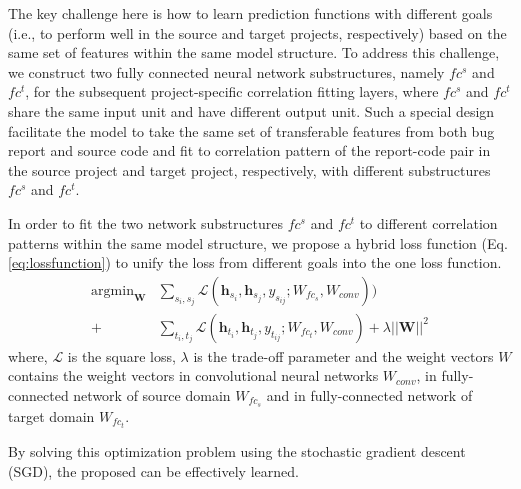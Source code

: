 The key challenge here is how to learn prediction functions with different goals (i.e., to perform well in the source and target projects, respectively) based on the same set of features within the same model structure. To address this challenge, we construct two fully connected neural network substructures, namely $fc^s$ and $fc^t$, for the subsequent project-specific correlation fitting layers, where $fc^s$ and $fc^t$ share the same input unit and have different output unit. Such a special design facilitate the model to take the same set of transferable features from both bug report and source code and fit to correlation pattern of the report-code pair in the source project and target project, respectively, with different substructures $fc^s$ and $fc^t$.

In order to fit the two network substructures $fc^s$ and $fc^t$ to different correlation patterns within the same model structure, we propose a hybrid loss function (Eq. \ref{eq:lossfunction}) to unify the loss from different goals into the one loss function.
\begin{equation}
\begin{aligned}
\label{eq:lossfunction}
\mathop{\arg\min}_{\mathbf{W}}&\sum_{s_i,s_j}\mathcal{L}(\mathbf{h}_{s_i},\mathbf{h}_{s_j}
,y_{s_{ij}}; W_{fc_s}, W_{conv} ))\\
+&\sum_{t_i,t_j}\mathcal{L}(\mathbf{h}_{t_i},\mathbf{h}_{t_j},y_{t_{ij}}; W_{fc_t}, W_{conv})+\lambda||\mathbf{W}||^2
\end{aligned}
\end{equation}
where, $\mathcal{L}$ is the square loss, $\lambda$ is the trade-off parameter and the weight vectors $W$ contains the weight vectors in convolutional neural networks $W_{conv}$, in fully-connected network of source domain $W_{fc_s}$ and in fully-connected network of target domain $W_{fc_t}$.

By solving this optimization problem using the stochastic gradient descent (SGD), the proposed \TRANPCNN can be effectively learned.
